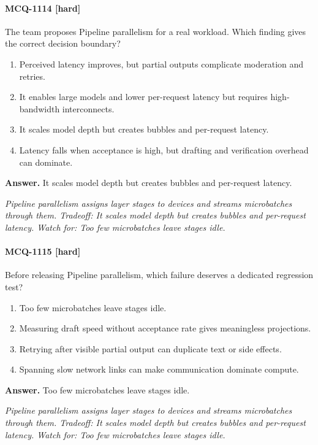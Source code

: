 \paragraph{MCQ-1114 [hard]} The team proposes Pipeline parallelism for a real workload. Which finding gives the correct decision boundary?
\begin{enumerate}[label=\Alph*.]
\item Perceived latency improves, but partial outputs complicate moderation and retries.
\item It enables large models and lower per-request latency but requires high-bandwidth interconnects.
\item It scales model depth but creates bubbles and per-request latency.
\item Latency falls when acceptance is high, but drafting and verification overhead can dominate.
\end{enumerate}
\noindent\textbf{Answer.} It scales model depth but creates bubbles and per-request latency.
\par\textit{Pipeline parallelism assigns layer stages to devices and streams microbatches through them. Tradeoff: It scales model depth but creates bubbles and per-request latency. Watch for: Too few microbatches leave stages idle.}
\paragraph{MCQ-1115 [hard]} Before releasing Pipeline parallelism, which failure deserves a dedicated regression test?
\begin{enumerate}[label=\Alph*.]
\item Too few microbatches leave stages idle.
\item Measuring draft speed without acceptance rate gives meaningless projections.
\item Retrying after visible partial output can duplicate text or side effects.
\item Spanning slow network links can make communication dominate compute.
\end{enumerate}
\noindent\textbf{Answer.} Too few microbatches leave stages idle.
\par\textit{Pipeline parallelism assigns layer stages to devices and streams microbatches through them. Tradeoff: It scales model depth but creates bubbles and per-request latency. Watch for: Too few microbatches leave stages idle.}
